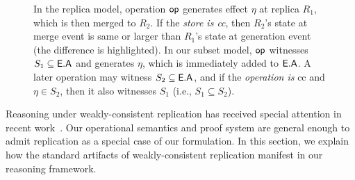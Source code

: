 \begin{figure}
{}
\hspace*{0.1in}
 \caption{In the replica model, operation $\textsf{op}$ generates effect
$\eta$ at replica $R_1$, which is then merged to $R_2$. If the
\emph{store is {\sc cc}}, then $R_2$'s state at merge event is same or
larger than $R_1$'s state at generation event (the difference is
highlighted). In our subset model, $\textsf{op}$ witnesses $S_1 \subseteq
\textsf{E}.\textsf{A}$ and generates $\eta$, which is immediately added to $\textsf{E}.\textsf{A}$. A
later operation may witness $S_2 \subseteq \textsf{E}.\textsf{A}$, and if the
\emph{operation is} {\sc cc} and $\eta \in S_2$, then it also
witnesses $S_1$ (i.e., $S_1 \subseteq S_2$). } 
\label{fig:ec-theirs-vs-ours}
\end{figure}

Reasoning under weakly-consistent replication has received special
attention in recent work~\cite{gotsmanpopl16}. Our operational
semantics and proof system are general enough to admit replication as
a special case of our formulation. In this section, we explain how the
standard artifacts of weakly-consistent replication manifest in our
reasoning framework.

